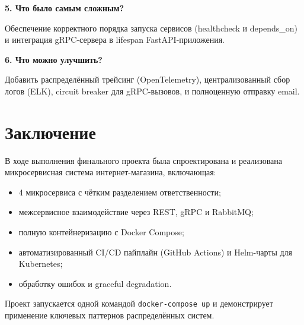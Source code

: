 \documentclass[14pt]{article}
\begin{document}
\textbf{5. Что было самым сложным?}

Обеспечение корректного порядка запуска сервисов (healthcheck и depends\_on) и интеграция gRPC-сервера в lifespan FastAPI-приложения.

\textbf{6. Что можно улучшить?}

Добавить распределённый трейсинг (OpenTelemetry), централизованный сбор логов (ELK), circuit breaker для gRPC-вызовов, и полноценную отправку email.

\section{Заключение}

В ходе выполнения финального проекта была спроектирована и реализована микросервисная система интернет-магазина, включающая:
\begin{itemize}
    \item 4 микросервиса с чётким разделением ответственности;
    \item межсервисное взаимодействие через REST, gRPC и RabbitMQ;
    \item полную контейнеризацию с Docker Compose;
    \item автоматизированный CI/CD пайплайн (GitHub Actions) и Helm-чарты для Kubernetes;
    \item обработку ошибок и graceful degradation.
\end{itemize}

Проект запускается одной командой \texttt{docker-compose up} и демонстрирует применение ключевых паттернов распределённых систем.
\end{document}
